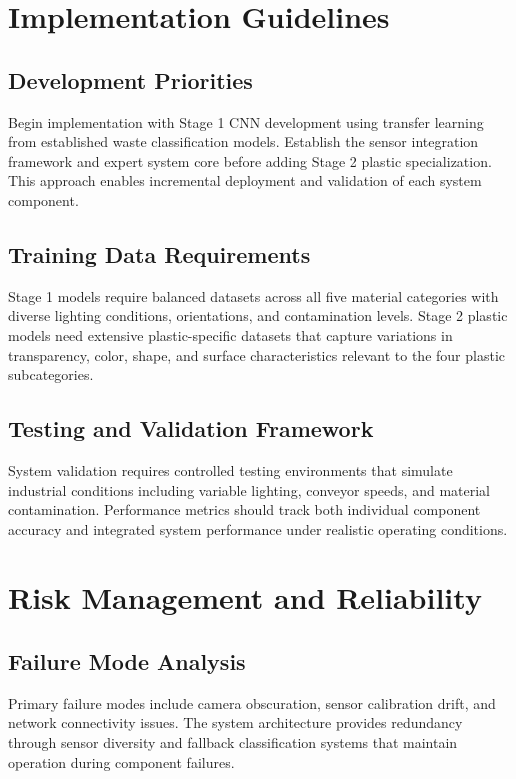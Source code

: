 \documentclass[11pt, a4paper]{article}
\begin{document}
\section{Implementation Guidelines}

\subsection{Development Priorities}
Begin implementation with Stage 1 CNN development using transfer learning from established waste classification models. Establish the sensor integration framework and expert system core before adding Stage 2 plastic specialization. This approach enables incremental deployment and validation of each system component.

\subsection{Training Data Requirements}
Stage 1 models require balanced datasets across all five material categories with diverse lighting conditions, orientations, and contamination levels. Stage 2 plastic models need extensive plastic-specific datasets that capture variations in transparency, color, shape, and surface characteristics relevant to the four plastic subcategories.

\subsection{Testing and Validation Framework}
System validation requires controlled testing environments that simulate industrial conditions including variable lighting, conveyor speeds, and material contamination. Performance metrics should track both individual component accuracy and integrated system performance under realistic operating conditions.

\section{Risk Management and Reliability}

\subsection{Failure Mode Analysis}
Primary failure modes include camera obscuration, sensor calibration drift, and network connectivity issues. The system architecture provides redundancy through sensor diversity and fallback classification systems that maintain operation during component failures.
\end{document}
